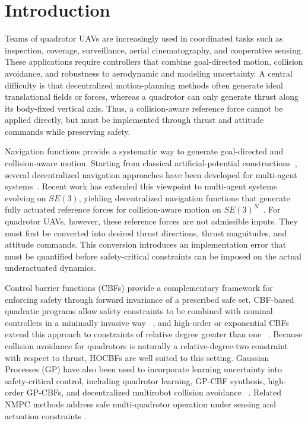 \documentclass[journal,twoside,web]{ieeecolor}
\begin{document}
\section{Introduction}

Teams of quadrotor UAVs are increasingly used in coordinated tasks such
as inspection, coverage, surveillance, aerial cinematography, and
cooperative sensing. These applications require controllers that combine
goal-directed motion, collision avoidance, and robustness to aerodynamic
and modeling uncertainty. A central difficulty is that decentralized motion-planning methods often
generate ideal translational fields or forces, whereas a quadrotor can
only generate thrust along its body-fixed vertical axis. Thus, a
collision-aware reference force cannot be applied directly, but must be
implemented through thrust and attitude commands while preserving safety.

Navigation functions provide a systematic way to generate
goal-directed and collision-aware motion. Starting from classical
artificial-potential constructions~\cite{RimonKoditschek1992}, several
decentralized navigation approaches have been developed for multi-agent
systems~\cite{DimarogonasKyriakopoulos2005, VerginisXuDimarogonas2017}.
Recent work has extended this viewpoint to multi-agent systems evolving
on \(SE(3)\), yielding decentralized navigation functions that generate
fully actuated reference forces for collision-aware motion
on \(SE(3)^N\)~\cite{YagoNietoSimoesGiribetColombo2026DNFSE3Learning}.
For quadrotor UAVs, however, these reference forces are not admissible
inputs. They must first be converted into desired thrust directions,
thrust magnitudes, and attitude commands. This conversion introduces an
implementation error that must be quantified before safety-critical
constraints can be imposed on the actual underactuated dynamics.

Control barrier functions (CBFs) provide a complementary framework for
enforcing safety through forward invariance of a prescribed safe set.
CBF-based quadratic programs allow safety constraints to be combined
with nominal controllers in a minimally invasive way
~\cite{AmesTAC2017}, and high-order or exponential CBFs
extend this approach to constraints of relative degree greater than one 
~\cite{NguyenACC2016,XiaoCDC2019,TanShawCortezDimarogonas2022}.
Because collision avoidance for quadrotors is naturally a
relative-degree-two constraint with respect to thrust, HOCBFs are well
suited to this setting. Gaussian Processes (GP) have also been used to incorporate learning
uncertainty into safety-critical control, including quadrotor
learning, GP-CBF synthesis, high-order GP-CBFs, and decentralized
multirobot collision avoidance
~\cite{WangTheodorouEgerstedt2018,JagtapPappasZamani2020,AaliLiu2024,HuFuWen2023}. Related NMPC methods address safe multi-quadrotor operation under sensing and actuation constraints \cite{GoarinLiSavioloLoianno2025}.
\end{document}
